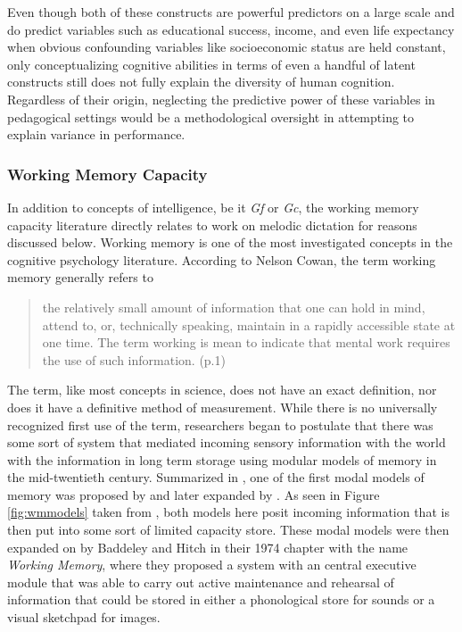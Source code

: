 \documentclass[]{book}
\begin{document}
Even though both of these constructs are powerful predictors on a large scale and do predict variables such as educational success, income, and even life expectancy \citep{ritchieIntelligenceAllThat2015} when obvious confounding variables like socioeconomic status are held constant, only conceptualizing cognitive abilities in terms of even a handful of latent constructs still does not fully explain the diversity of human cognition.
Regardless of their origin, neglecting the predictive power of these variables in pedagogical settings would be a methodological oversight in attempting to explain variance in performance.

\hypertarget{working-memory-capacity}{%
\subsubsection{Working Memory Capacity}\label{working-memory-capacity}}

In addition to concepts of intelligence, be it \emph{Gf} or \emph{Gc}, the working memory capacity literature directly relates to work on melodic dictation for reasons discussed below.
Working memory is one of the most investigated concepts in the cognitive psychology literature.
According to Nelson Cowan, the term working memory generally refers to

\begin{quote}
the relatively small amount of information that one can hold in mind, attend to, or, technically speaking, maintain in a rapidly accessible state at one time. The term working is mean to indicate that mental work requires the use of such information. (p.1) \citep{cowanWorkingMemoryCapacity2005}
\end{quote}

The term, like most concepts in science, does not have an exact definition, nor does it have a definitive method of measurement.
While there is no universally recognized first use of the term, researchers began to postulate that there was some sort of system that mediated incoming sensory information with the world with the information in long term storage using modular models of memory in the mid-twentieth century.
Summarized in \citet{cowanWorkingMemoryCapacity2005}, one of the first modal models of memory was proposed by \citet{broadbentPerceptionCommunication1958} and later expanded by \citet{atkinsonHUMANMEMORYPROPOSED1968}.
As seen in Figure \ref{fig:wmmodels} taken from \citet{cowanWorkingMemoryCapacity2005}, both models here posit incoming information that is then put into some sort of limited capacity store.
These modal models were then expanded on by Baddeley and Hitch \citep{baddeleyWorkingMemory1974} in their 1974 chapter with the name \emph{Working Memory}, where they proposed a system with an central executive module that was able to carry out active maintenance and rehearsal of information that could be stored in either a phonological store for sounds or a visual sketchpad for images.
\end{document}
